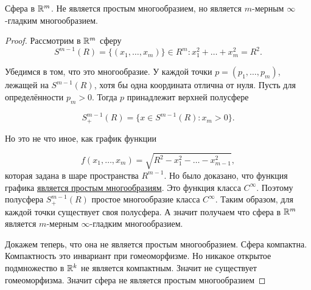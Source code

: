 \begin{example}
    Сфера в $\mathbb{R}^{m}$. Не является простым многообразием, но является $m$-мерным $\infty$-гладким многообразием. 
    \begin{proof}
Рассмотрим в $\mathbb{R}^m$ сферу
$$S^{m-1}(R) = \{(x_1,\dots, x_m)\} \in R^{m}: x^2_1 +…+ x^2_m = R^2.$$

Убедимся в том, что это многообразие. У каждой точки $p=(p_1,\dots, p_m)$,
лежащей на $S^{m-1}(R)$, хотя бы одна координата отлична от нуля. Пусть для определённости $p_m > 0$. Тогда $p$ принадлежит верхней
полусфере

$$S^{m-1}_{+} (R) = \{x \in S^{m-1}(R): x_{m} > 0\}.$$

Но это не что иное, как график функции

$$f(x_1,\dots, x_m) = \sqrt{R^2 - x^{2}_1 - \dots - x^{2}_{m-1}},$$
которая задана в шаре пространства $R^{m-1}$. Но было доказано, что функция графика \hyperlink{example3.2}{является простым многообразиям}. Это функция класса $C^{\infty}$. Поэтому полусфера $S^{m-1}_{+} (R)$ простое многообразие класса $C^{\infty}$. Таким образом, для каждой точки существует своя полусфера. А значит получаем что сфера в $\mathbb{R}^m$ является $m$-мерным $\infty$-гладким многообразием. 
    
Докажем теперь, что она не является простым многообразием. Сфера компактна. Компактность это инвариант при гомеоморфизме. Но никакое открытое подмножество в $\mathbb{R}^k$ не является компактным. Значит не существует гомеоморфизма. Значит сфера не является простым многообразием

    \end{proof}

\end{example}

